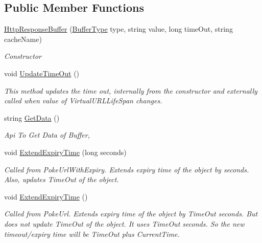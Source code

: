 \subsection*{Public Member Functions}
\begin{DoxyCompactItemize}
\item 
\mbox{\hyperlink{class_concord_1_1_c3_http_module_1_1_http_response_buffer_ad257bda222318401c41e4a9465e3ed84}{Http\+Response\+Buffer}} (\mbox{\hyperlink{class_concord_1_1_c3_http_module_1_1_http_response_buffer_a34a310395d4f4472b24cf6da3fc3ab82}{Buffer\+Type}} type, string value, long time\+Out, string cache\+Name)
\begin{DoxyCompactList}\small\item\em Constructor \end{DoxyCompactList}\item 
void \mbox{\hyperlink{class_concord_1_1_c3_http_module_1_1_http_response_buffer_a29b2c2d2262cb331fe0f18e1dd930b5e}{Update\+Time\+Out}} ()
\begin{DoxyCompactList}\small\item\em This method updates the time out, internally from the constructor and externally called when value of Virtual\+U\+R\+L\+Life\+Span changes. \end{DoxyCompactList}\item 
string \mbox{\hyperlink{class_concord_1_1_c3_http_module_1_1_http_response_buffer_a78e479ce9315db0f118145e814926b48}{Get\+Data}} ()
\begin{DoxyCompactList}\small\item\em Api To Get Data of Buffer, \end{DoxyCompactList}\item 
void \mbox{\hyperlink{class_concord_1_1_c3_http_module_1_1_http_response_buffer_abfe159e6516c39e5ad77bdac8350f09b}{Extend\+Expiry\+Time}} (long seconds)
\begin{DoxyCompactList}\small\item\em Called from Poke\+Url\+With\+Expiry. Extends expiry time of the object by \textquotesingle{}seconds\textquotesingle{}. Also, updates Time\+Out of the object. \end{DoxyCompactList}\item 
void \mbox{\hyperlink{class_concord_1_1_c3_http_module_1_1_http_response_buffer_a4d61d781c5b28fa7969cbf0fd9ce4720}{Extend\+Expiry\+Time}} ()
\begin{DoxyCompactList}\small\item\em Called from Poke\+Url. Extends expiry time of the object by Time\+Out seconds. But does not update Time\+Out of the object. It uses Time\+Out seconds. So the new timeout/expiry time will be Time\+Out plus Current\+Time. \end{DoxyCompactList}\end{DoxyCompactItemize}
